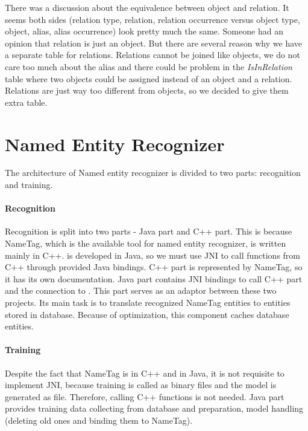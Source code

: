 There was a discussion about the equivalence between object and relation. It
seems both sides (relation type, relation, relation occurrence versus object type,
object, alias, alias occurrence) look pretty much the same. Someone had an
opinion that relation is just an object. But there are several reason why we
have a separate table for relations. Relations cannot be joined like objects, we
do not care too much about the alias and there could be problem in the 
\emph{IsInRelation} table where two objects could be assigned instead of an
object and a relation. Relations are just way too different from objects, so we
decided to give them extra table.

\section{Named Entity Recognizer}
\label{sec:NamedEntityRecognizer}

The architecture of Named entity recognizer is divided to two parts: recognition
and training.

\paragraph{Recognition} 
Recognition is split into two parts - Java part and C++ part. This is because
NameTag, which is the available tool for named entity recognizer, is written
mainly in C++. \textan{} is developed in Java, so we must use JNI to call
functions from C++ through provided Java bindings. C++ part is represented by
NameTag, so it has its own documentation. Java part contains JNI bindings to
call C++ part and the connection to \textan{}. This part serves as an adaptor
between these two projects. Its main task is to translate recognized NameTag
entities to entities stored in \textan{} database. Because of optimization, this
component caches database entities.

\paragraph{Training}
Despite the fact that NameTag is in C++ and \textan{} in Java, it is not
requisite to implement JNI, because training is called as binary files and the
model is generated as file. Therefore, calling C++ functions is not needed. Java
part provides training data collecting from database and preparation, model
handling (deleting old ones and binding them to NameTag).

